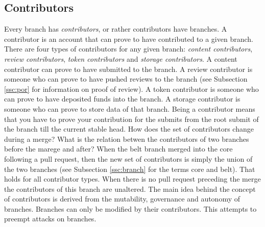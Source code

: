 






\subsection{Contributors}
\label{ssc:contributors}
Every branch has \textit{contributors}, or rather contributors have branches. A contributor is an account that can prove to have contributed to a given branch. There are four types of contributors for any given branch: \textit{content contributors}, \textit{review contributors}, \textit{token contributors} and \textit{storage contributors}. A content contributor can prove to have submitted to the branch. A review contributor is someone who can prove to have pushed reviews to the branch (see Subsection \ref{ssc:por} for information on proof of review). A token contributor is someone who can prove to have deposited funds into the branch. A storage contributor is someone who can prove to store data of that branch. Being a contributor means that you have to prove your contribution for the submits from the root submit of the branch till the current stable head.
How does the set of contributors change during a merge? What is the relation betwen the contributors of two branches before the marege and after? When the belt branch merged into the core following a pull request, then the new set of contributors is simply the union of the two branches (see Subsection \ref{ssc:branch} for the terms core and belt). That holds for all contributor types. When there is no pull request preceding the merge the contributors of this branch are unaltered.
The main idea behind the concept of contributors is derived from the mutability, governance and autonomy of branches. Branches can only be modified by their contributors. This attempts to preempt attacks on branches.

